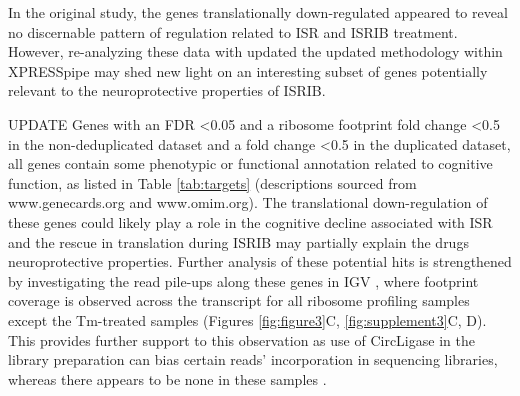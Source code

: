 \documentclass[11pt, a4paper, oneside]{article}
\begin{document}
In the original study, the genes translationally down-regulated appeared to reveal no discernable pattern of regulation related to ISR and ISRIB treatment. However, re-analyzing these data with updated the updated methodology within XPRESSpipe may shed new light on an interesting subset of genes potentially relevant to the neuroprotective properties of ISRIB.

UPDATE
Genes with an FDR \textless 0.05 and a ribosome footprint fold change \textless 0.5 in the non-deduplicated dataset and a fold change \textless 0.5 in the duplicated dataset, all genes contain some phenotypic or functional annotation related to cognitive function, as listed in Table \ref{tab:targets} (descriptions sourced from www.genecards.org and www.omim.org). The translational down-regulation of these genes could likely play a role in the cognitive decline associated with ISR and the rescue in translation during ISRIB may partially explain the drugs neuroprotective properties. Further analysis of these potential hits is strengthened by investigating the read pile-ups along these genes in IGV \cite{igv}, where footprint coverage is observed across the transcript for all ribosome profiling samples except the Tm-treated samples (Figures \ref{fig:figure3}C, \ref{fig:supplement3}C, D). This provides further support to this observation as use of CircLigase in the library preparation can bias certain reads' incorporation in sequencing libraries, whereas there appears to be none in these samples \cite{circligase_bias}.
\end{document}
